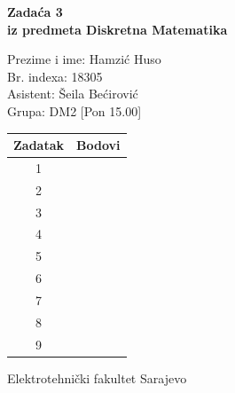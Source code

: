 \documentclass[12pt]{article}
\newcommand{\prezimeIme}{Hamzić Huso}
\newcommand{\brIndexa}{18305}
\newcommand{\brZadace}{3}
\begin{document}
    
    \thispagestyle{empty}
    \begin{center}
      \vspace*{1cm}

      \vspace*{2cm}
      {\huge \bf Zadaća \brZadace } \\
      \vspace*{1cm}
      {\Large \bf iz predmeta Diskretna Matematika}

      \vspace*{1.25cm}

      {\Large Prezime i ime: \prezimeIme} \\
      \vspace*{0.5cm}
      {\Large Br. indexa: \brIndexa} \\
      \vspace*{0.5cm}
      {\Large Asistent: Šeila Bećirović} \\
      \vspace*{0.5cm}
      {\Large Grupa: DM2 [Pon 15.00]} \\ 
      
      \vspace*{2cm}
      \renewcommand{\arraystretch}{1.75}
      \begin{tabular}{|c|c|}
    	\hline Zadatak & Bodovi \\
    	\hline 1 &  \\
    	\hline 2 &  \\
    	\hline 3 &  \\
    	\hline 4 &  \\
    	\hline 5 &  \\
    	\hline 6 &  \\
    	\hline 7 &  \\
    	\hline 8 &  \\
    	\hline 9 &  \\
    	\hline
     \end{tabular}

      \vfill


      {\large Elektrotehnički fakultet Sarajevo}

    \end{center}
    \newpage
    \thispagestyle{empty}
    
\end{document}

